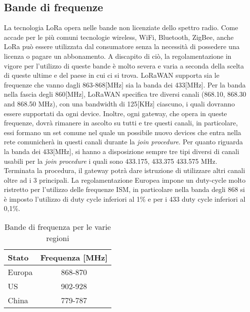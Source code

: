 \subsection{Bande di frequenze}
La tecnologia LoRa opera nelle bande non licenziate dello spettro radio.  Come
accade per le più comuni tecnologie wireless, WiFi, Bluetooth, ZigBee, anche LoRa
può essere utilizzata dal consumatore senza la necessità di possedere una
licenza o pagare un abbonamento.
A discapito di ciò, la regolamentazione in vigore per l'utilizzo di queste bande 
è molto severa e varia a seconda della scelta di queste ultime e del paese in
cui ci si trova.
LoRaWAN supporta sia le frequenze che vanno dagli
863-868[MHz] sia la banda dei 433[MHz]. Per la banda  nella fascia
degli 860[MHz], LoRaWAN specifica tre diversi canali (868.10, 868.30 and 868.50
MHz), con una bandwidth di 125[KHz] ciascuno, i quali dovranno essere supportati
da ogni device. Inoltre, ogni gateway, che opera in queste frequenze, dovrà
rimanere in ascolto su tutti e tre questi canali, in particolare, essi
formano un set comune nel quale un possibile nuovo devices che entra nella rete
comunicherà in questi canali durante la \emph{join procedure}. Per
quanto riguarda la banda dei 433[MHz], si hanno a disposizione sempre tre tipi
diversi di canali usabili per la \emph{join procedure} i quali sono 433.175, 
433.375  433.575 MHz. Terminata la procedura, il gateway potrà dare istruzione
di utilizzare altri canali oltre ad i 3 principali.
La regolamentazione Europea impone un duty-cycle molto ristretto per l'utilizzo
delle frequenze ISM, in particolare nella banda degli 868 si è imposto
l'utilizzo di duty cycle inferiori al 1\% e per i 433 duty cycle inferiori al
0,1\%.
\begin{table}[h]
        \centering
        \begin{tabular}{l|c}
                \toprule
                Stato   & Frequenza [MHz] \\
                \hline
                Europa  & 868-870 \\
                US      & 902-928 \\
                China   & 779-787 \\
                \bottomrule
        \end{tabular}
        \caption{Bande di frequenza per le varie regioni}
\end{table}

